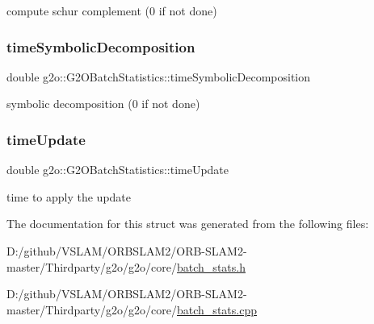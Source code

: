 compute schur complement (0 if not done) 

\mbox{\label{structg2o_1_1_g2_o_batch_statistics_a456a521ccb1e4c69940475a92a1f5d29}} 
\subsubsection{\texorpdfstring{time\+Symbolic\+Decomposition}{timeSymbolicDecomposition}}
{\footnotesize\ttfamily double g2o\+::\+G2\+O\+Batch\+Statistics\+::time\+Symbolic\+Decomposition}



symbolic decomposition (0 if not done) 

\mbox{\label{structg2o_1_1_g2_o_batch_statistics_a510e287e5a3e1f608219147b53e6dc69}} 
\subsubsection{\texorpdfstring{time\+Update}{timeUpdate}}
{\footnotesize\ttfamily double g2o\+::\+G2\+O\+Batch\+Statistics\+::time\+Update}



time to apply the update 



The documentation for this struct was generated from the following files\+:\begin{DoxyCompactItemize}
\item 
D\+:/github/\+V\+S\+L\+A\+M/\+O\+R\+B\+S\+L\+A\+M2/\+O\+R\+B-\/\+S\+L\+A\+M2-\/master/\+Thirdparty/g2o/g2o/core/\mbox{\hyperlink{batch__stats_8h}{batch\+\_\+stats.\+h}}\item 
D\+:/github/\+V\+S\+L\+A\+M/\+O\+R\+B\+S\+L\+A\+M2/\+O\+R\+B-\/\+S\+L\+A\+M2-\/master/\+Thirdparty/g2o/g2o/core/\mbox{\hyperlink{batch__stats_8cpp}{batch\+\_\+stats.\+cpp}}\end{DoxyCompactItemize}
